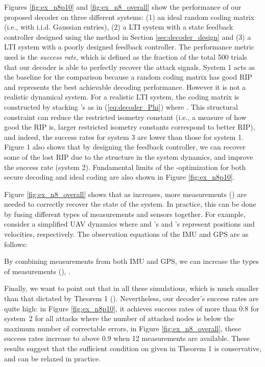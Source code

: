 \documentclass[journal]{IEEEtran}
\begin{document}
Figures \ref{fig:ex_n8p10} and \ref{fig:ex_n8_overall} show the performance of our proposed decoder on three different systems: (1) an ideal random coding matrix (i.e., with i.i.d. Gaussian entries), (2) a LTI system with a state feedback controller designed using the method in Section \ref{sec:decoder_design} and (3) a LTI system with a poorly designed feedback controller. 
The performance metric used is the \textit{success rate}, which is defined as the fraction of the total 500 trials that our decoder is able to perfectly recover the attack signals.
System 1 acts as the baseline for the comparison because a random coding matrix has good RIP and represents the best achievable decoding performance. However it is not a realistic dynamical system. For a realistic LTI system, the coding matrix  is constructed by stacking 's as in (\ref{eq:decoder_Phi}) where . This structural constraint can reduce the restricted isometry constant (i.e., a measure of how good the RIP is, larger restricted isometry constants correspond to better RIP), and indeed, the success rates for system 3 are lower than those for system 1. Figure 1 also shows that by designing the feedback controller, we can recover some of the lost RIP due to the structure in the system dynamics, and improve the success rate (system 2).
Fundamental limits of the -optimization for both secure decoding and ideal coding are also shown in Figure \ref{fig:ex_n8p10}. 


Figure \ref{fig:ex_n8_overall} shows that as  increases, more measurements () are needed to correctly recover the state of the system. In practice, this can be done by fusing different types of measurements and sensors together. For example, consider a simplified UAV dynamics where  and 's and 's represent positions and velocities, respectively. The observation equations of the IMU and GPS are as follows:

By combining measurements from both IMU and GPS, we can increase the types of measurements (), .

Finally, we want to point out that  in all these simulations, which is much smaller than that dictated by Theorem 1 ().
Nevertheless, our decoder's success rates are quite high: in Figure \ref{fig:ex_n8p10}, it achieves success rates of more than 0.8 for system~2 for all attacks where the number of attacked nodes is below the maximum number of correctable errors, in Figure \ref{fig:ex_n8_overall}, these success rates increase to above 0.9 when 12 measurements are available. These results suggest that the sufficient condition on  given in Theorem 1 is conservative, and can be relaxed in practice.
\end{document}
